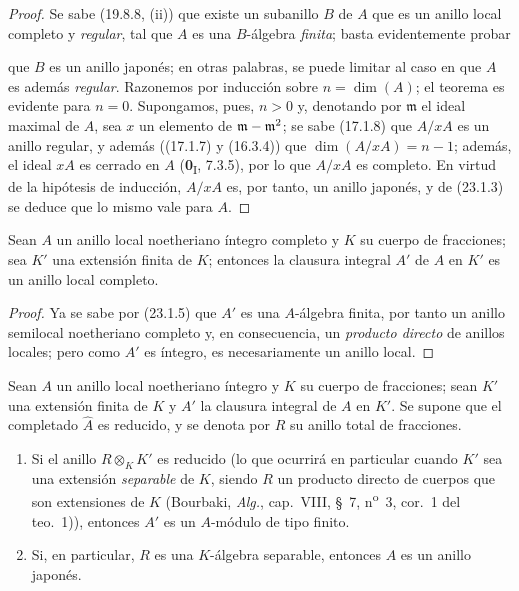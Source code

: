 \begin{proof}
Se sabe (19.8.8, (ii)) que existe un subanillo $B$ de $A$ que es un
anillo local completo y \emph{regular}, tal que $A$ es una $B$-álgebra \emph{finita}; basta
evidentemente probar


que $B$ es un anillo japonés; en otras palabras, se puede limitar al caso en que
$A$ es además \emph{regular}. Razonemos por inducción sobre
$n=\dim(A)$; el teorema es evidente para $n=0$. Supongamos, pues, $n>0$ y,
denotando por $\mathfrak m$ el ideal maximal de $A$, sea $x$ un elemento de
$\mathfrak m-\mathfrak m^2$; se sabe (17.1.8) que $A/xA$ es un anillo
regular, y además ((17.1.7) y (16.3.4)) que
$\dim(A/xA)=n-1$; además, el ideal $xA$ es cerrado en $A$
(\textbf{0}\textsubscript{I}, 7.3.5), por lo que $A/xA$ es completo. En virtud de la hipótesis
de inducción, $A/xA$ es, por tanto, un anillo japonés, y de
(23.1.3) se deduce que lo mismo vale para $A$.
\end{proof}

\begin{corollary}[23.1.6]
\label{0.23.1.6-fr}
Sean $A$ un anillo local noetheriano íntegro completo y $K$ su cuerpo de
fracciones; sea $K'$ una extensión finita de $K$; entonces la clausura integral
$A'$ de $A$ en $K'$ es un anillo local completo.
\end{corollary}

\begin{proof}
Ya se sabe por (23.1.5) que $A'$ es una $A$-álgebra finita, por tanto un anillo
semilocal noetheriano completo y, en consecuencia, un \emph{producto directo}
de anillos locales; pero como $A'$ es íntegro, es necesariamente un
anillo local.
\end{proof}

\begin{proposition}[23.1.7]
\label{0.23.1.7-fr}
Sean $A$ un anillo local noetheriano íntegro y $K$ su cuerpo de fracciones;
sean $K'$ una extensión finita de $K$ y $A'$ la clausura integral de $A$ en
$K'$. Se supone que el completado $\widehat A$ es \textup{reducido}, y se denota por
$R$ su anillo total de fracciones.
\begin{enumerate}
  \item[\textup{(i)}] Si el anillo $R\otimes_KK'$ es reducido \textup{(lo que ocurrirá en
  particular cuando $K'$ sea una extensión \emph{separable} de $K$, siendo $R$ un
  producto directo de cuerpos que son extensiones de $K$ (Bourbaki, \emph{Alg.},
  cap.~VIII, §~7, n\textsuperscript{o}~3, cor.~1 del teo.~1))}, entonces $A'$ es
  un $A$-módulo de tipo finito.
  \item[\textup{(ii)}] Si, en particular, $R$ es una $K$-álgebra separable, entonces $A$
  es un anillo japonés.
\end{enumerate}
\end{proposition}

